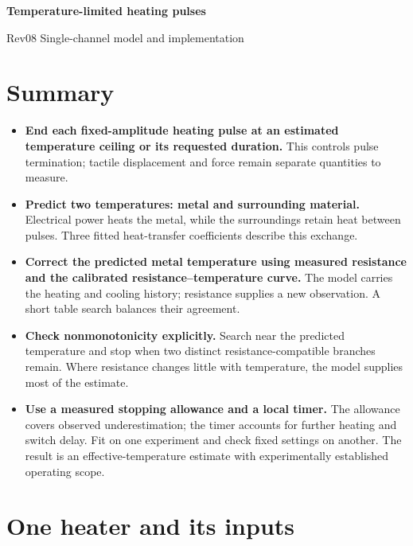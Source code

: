 \documentclass[11pt,letterpaper]{article}
\begin{document}
\begin{center}
{\LARGE\bfseries Temperature-limited heating pulses\par}
\vspace{0.45em}
{\small Rev08 \textperiodcentered{} Single-channel model and implementation\par}
\end{center}
\vspace{0.25em}


\section*{Summary}

\begin{itemize}
\item \textbf{End each fixed-amplitude heating pulse at an estimated temperature ceiling or its requested duration.} This controls pulse termination; tactile displacement and force remain separate quantities to measure.
\item \textbf{Predict two temperatures: metal and surrounding material.} Electrical power heats the metal, while the surroundings retain heat between pulses. Three fitted heat-transfer coefficients describe this exchange.
\item \textbf{Correct the predicted metal temperature using measured resistance and the calibrated resistance--temperature curve.} The model carries the heating and cooling history; resistance supplies a new observation. A short table search balances their agreement.
\item \textbf{Check nonmonotonicity explicitly.} Search near the predicted temperature and stop when two distinct resistance-compatible branches remain. Where resistance changes little with temperature, the model supplies most of the estimate.
\item \textbf{Use a measured stopping allowance and a local timer.} The allowance covers observed underestimation; the timer accounts for further heating and switch delay. Fit on one experiment and check fixed settings on another. The result is an effective-temperature estimate with experimentally established operating scope.
\end{itemize}

\section{One heater and its inputs}
\end{document}
